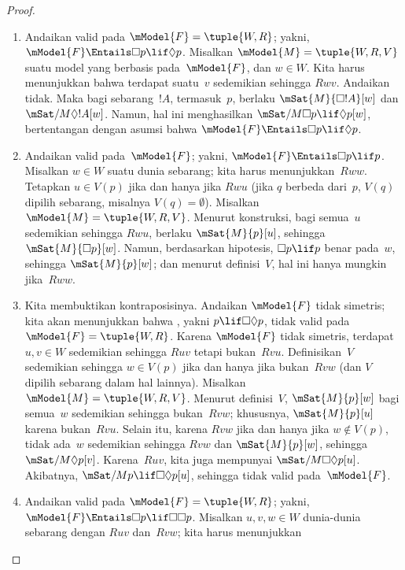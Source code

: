 \documentclass[../../../include/open-logic-section]{subfiles}
\begin{document}
\begin{proof}
  \begin{enumerate}
  \item Andaikan  valid pada $\mModel{F}=\tuple{W,R}$; yakni,
    $\mModel{F}\Entails\Box p\lif\Diamond p$. Misalkan
    $\mModel{M}=\tuple{W,R,V}$ suatu model yang berbasis pada~$\mModel{F}$,
    dan $w\in W$. Kita harus menunjukkan bahwa terdapat suatu~$v$ sedemikian
    sehingga $Rwv$. Andaikan tidak. Maka bagi sebarang~$!A$, termasuk~$p$,
    berlaku $\mSat{M}{\Box !A}[w]$ dan
    $\mSat/{M}{\Diamond !A}[w]$. Namun, hal ini menghasilkan
    $\mSat/{M}{\Box p\lif\Diamond p}[w]$, bertentangan dengan asumsi bahwa
    $\mModel{F}\Entails\Box p\lif\Diamond p$.
  \item Andaikan  valid pada~$\mModel{F}$; yakni,
    $\mModel{F}\Entails\Box p\lif p$. Misalkan $w\in W$ suatu dunia
    sebarang; kita harus menunjukkan~$Rww$. Tetapkan $u\in V(p)$ jika dan
    hanya jika $Rwu$ (jika $q$ berbeda dari~$p$, $V(q)$ dipilih sebarang,
    misalnya $V(q)=\emptyset$). Misalkan $\mModel{M}=\tuple{W,R,V}$. Menurut
    konstruksi, bagi semua~$u$ sedemikian sehingga $Rwu$, berlaku
    $\mSat{M}{p}[u]$, sehingga $\mSat{M}{\Box p}[w]$. Namun, berdasarkan
    hipotesis, $\Box p\lif p$ benar pada~$w$, sehingga $\mSat{M}{p}[w]$;
    dan menurut definisi~$V$, hal ini hanya mungkin jika~$Rww$.
  \item Kita membuktikan kontraposisinya. Andaikan $\mModel{F}$ tidak
    simetris; kita akan menunjukkan bahwa , yakni
    $p\lif\Box\Diamond p$, tidak valid pada
    $\mModel{F}=\tuple{W,R}$. Karena $\mModel{F}$ tidak simetris, terdapat
    $u,v\in W$ sedemikian sehingga $Ruv$ tetapi bukan~$Rvu$. Definisikan~$V$
    sedemikian sehingga $w\in V(p)$ jika dan hanya jika bukan~$Rvw$ (dan
    $V$ dipilih sebarang dalam hal lainnya). Misalkan
    $\mModel{M}=\tuple{W,R,V}$. Menurut definisi~$V$,
    $\mSat{M}{p}[w]$ bagi semua~$w$ sedemikian sehingga bukan~$Rvw$;
    khususnya, $\mSat{M}{p}[u]$ karena bukan~$Rvu$. Selain itu, karena $Rvw$
    jika dan hanya jika $w\notin V(p)$, tidak ada~$w$ sedemikian sehingga
    $Rvw$ dan $\mSat{M}{p}[w]$, sehingga
    $\mSat/{M}{\Diamond p}[v]$. Karena~$Ruv$, kita juga mempunyai
    $\mSat/{M}{\Box\Diamond p}[u]$. Akibatnya,
    $\mSat/{M}{p\lif\Box\Diamond p}[u]$, sehingga  tidak valid
    pada~$\mModel{F}$.
  \item Andaikan  valid pada $\mModel{F}=\tuple{W,R}$; yakni,
    $\mModel{F}\Entails\Box p\lif\Box\Box p$. Misalkan $u,v,w\in W$
    dunia-dunia sebarang dengan $Ruv$ dan~$Rvw$; kita harus menunjukkan

\end{enumerate}
\end{proof}
\end{document}
